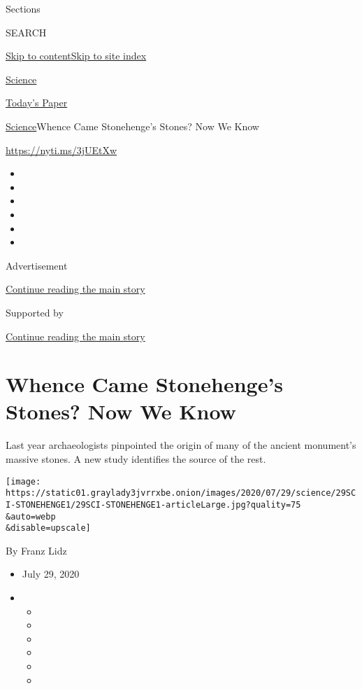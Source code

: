 Sections

SEARCH

\protect\hyperlink{site-content}{Skip to
content}\protect\hyperlink{site-index}{Skip to site index}

\href{https://www.nytimes3xbfgragh.onion/section/science}{Science}

\href{https://myaccount.nytimes3xbfgragh.onion/auth/login?response_type=cookie\&client_id=vi}{}

\href{https://www.nytimes3xbfgragh.onion/section/todayspaper}{Today's
Paper}

\href{/section/science}{Science}\textbar{}Whence Came Stonehenge's
Stones? Now We Know

\url{https://nyti.ms/3jUEtXw}

\begin{itemize}
\item
\item
\item
\item
\item
\item
\end{itemize}

Advertisement

\protect\hyperlink{after-top}{Continue reading the main story}

Supported by

\protect\hyperlink{after-sponsor}{Continue reading the main story}

\hypertarget{whence-came-stonehenges-stones-now-we-know}{%
\section{Whence Came Stonehenge's Stones? Now We
Know}\label{whence-came-stonehenges-stones-now-we-know}}

Last year archaeologists pinpointed the origin of many of the ancient
monument's massive stones. A new study identifies the source of the
rest.

\texttt{[image: https://static01.graylady3jvrrxbe.onion/images/2020/07/29/science/29SCI-STONEHENGE1/29SCI-STONEHENGE1-articleLarge.jpg?quality=75\\\&auto=webp\\\&disable=upscale]}

By Franz Lidz

\begin{itemize}
\item
  July 29, 2020
\item
  \begin{itemize}
  \item
  \item
  \item
  \item
  \item
  \item
  \end{itemize}
\end{itemize}

